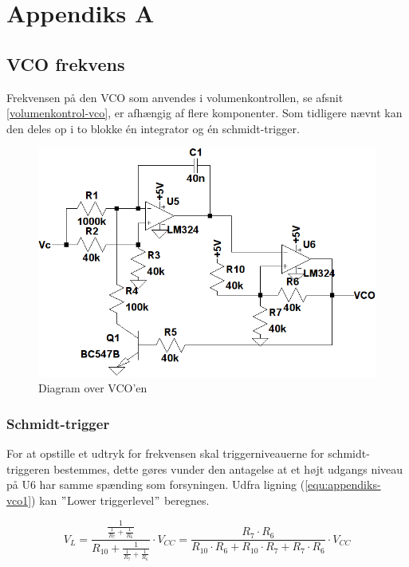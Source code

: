\chapter{Appendiks A}
\label{vco-frekvens}
\section*{VCO frekvens}

Frekvensen på den VCO som anvendes i volumenkontrollen, se afsnit \ref{volumenkontrol-vco}, er afhængig af flere komponenter. Som tidligere nævnt kan den deles op i to blokke én integrator og én schmidt-trigger. 

\begin{figure}[h]
\centering
\includegraphics[width=\textwidth]{teknisk/volumenkontrol/vco.png}
\caption{Diagram over VCO'en}
\label{fig:appendiks-vco}
\end{figure}

\subsection*{Schmidt-trigger}

For at opstille et udtryk for frekvensen skal triggerniveauerne for schmidt-triggeren bestemmes, dette gøres vunder den antagelse at et højt udgangs niveau på U6 har samme spænding som forsyningen. Udfra ligning (\ref{equ:appendiks-vco1}) kan $"$Lower triggerlevel$"$ beregnes.

\begin{equation}
\label{equ:appendiks-vco1}
V_L = \frac{\frac{1}{\frac{1}{R_7} + \frac{1}{R_6}}}{R_{10} + \frac{1}{\frac{1}{R_7} + \frac{1}{R_6}}} \cdot V_{CC} = \frac{R_7 \cdot R_6}{R_{10} \cdot R_6 + R_{10} \cdot R_7 + R_7 \cdot R_6} \cdot V_{CC}
\end{equation}

